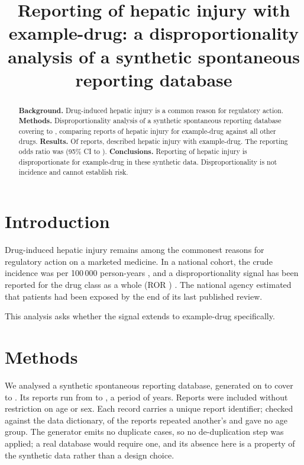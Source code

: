 \documentclass{article}
\title{Reporting of hepatic injury with example-drug: a disproportionality analysis of a synthetic spontaneous reporting database}
\begin{document}
\maketitle

\begin{abstract}
\textbf{Background.} Drug-induced hepatic injury is a common reason for regulatory action.
\textbf{Methods.} Disproportionality analysis of a synthetic spontaneous reporting database
covering  to , comparing
reports of hepatic injury for example-drug against all other drugs.
\textbf{Results.} Of  reports,  described
hepatic injury with example-drug. The reporting odds ratio was 
(95\% CI  to ).
\textbf{Conclusions.} Reporting of hepatic injury is disproportionate for example-drug in these
synthetic data. Disproportionality is not incidence and cannot establish risk.
\end{abstract}

\section{Introduction}

Drug-induced hepatic injury remains among the commonest reasons for regulatory action on a
marketed medicine. In a national cohort, the crude incidence was
 per 100\,000 person-years
\cite{fictionalHepaticCohort2021}, and a disproportionality signal has been reported for the
drug class as a whole (ROR ) \cite{fictionalClassSignal2019}. The
national agency estimated that  patients had been exposed
by the end of its last published review.

This analysis asks whether the signal extends to example-drug specifically.

\section{Methods}

We analysed a synthetic spontaneous reporting database, generated on
 to cover  to
. Its reports run from
 to , a period of
 years. Reports were included without restriction on age or sex.
Each record carries a unique report identifier; checked against the data dictionary,  of the 
reports repeated another's and  gave no age group. The generator emits no duplicate cases, so no de-duplication
step was applied; a real database would require one, and its absence here is a property of the synthetic data rather than a design choice.
\end{document}
